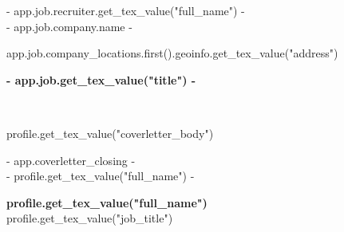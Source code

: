 \documentclass[a4paper, {{- app.cv.latex_pt -}}pt]{report}
\begin{document}
\vspace{10mm}
{{- app.job.recruiter.get_tex_value("full_name") -}} \\
{{- app.job.company.name -}} \\
{%
{{ app.job.company_locations.first().geoinfo.get_tex_value("address") }}
{%

\begin{center}
\textbf{ {{- app.job.get_tex_value("title") -}} }\\
\vspace{15mm}
\end{center}

\\

\vspace{-3mm}\setlength\parindent{24pt}

{{ profile.get_tex_value("coverletter_body") }}

\vspace{5mm}

\vspace{10mm}

\begin{flushleft}
{{- app.coverletter_closing -}}\\
{{- profile.get_tex_value("full_name") -}}\\
\vspace{3mm}

\end{flushleft}

\pagebreak

\begin{center}
  \textbf{\Huge {{ profile.get_tex_value("full_name") }}} \\
  \vspace{2mm}
   {{ profile.get_tex_value("job_title") }}
\end{center}

\vspace{4mm}

}}
\end{document}
